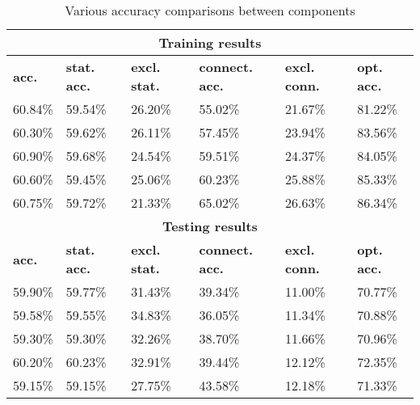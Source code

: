 \begin{table}[htp]
    \centering 
	\begin{tabular}{|l|l|l|l|l|l|}
		\hline
		\multicolumn{6}{|c|}{\bf Training results } \\ \hline
		{\bf acc.} & {\bf stat. acc.} & {\bf excl. stat.}& {\bf connect. acc. } & {\bf excl. conn. } & {\bf opt. acc.} \\ \hline
		60.84\%	   &  59.54\%    & 26.20\%   &  55.02\%  & 21.67\%   & 81.22\% \\ \hline
		60.30\%    &  59.62\%    & 26.11\%   &  57.45\%  & 23.94\%   & 83.56\% \\ \hline
		60.90\%    &  59.68\%    & 24.54\%   &  59.51\%  & 24.37\%   & 84.05\% \\ \hline
		60.60\%    &  59.45\%    & 25.06\%   &  60.23\%  & 25.88\%   & 85.33\% \\ \hline
		60.75\%    &  59.72\%    & 21.33\%   &  65.02\%  & 26.63\%   & 86.34\% \\ \hline
		\multicolumn{6}{|c|}{\bf Testing results } \\ \hline
		{\bf acc.} & {\bf stat. acc.} & {\bf excl. stat.} & {\bf connect. acc. } & {\bf excl. conn. } & {\bf opt. acc.} \\ \hline
		59.90\%    &  59.77\%   & 31.43\%   &  39.34\%   & 11.00\%   & 70.77\% \\ \hline
		59.58\%    &  59.55\%   & 34.83\%   &  36.05\%   & 11.34\%   & 70.88\% \\ \hline
		59.30\%    &  59.30\%   & 32.26\%   &  38.70\%   & 11.66\%   & 70.96\% \\ \hline
		60.20\%    &  60.23\%   & 32.91\%   &  39.44\%   & 12.12\%   & 72.35\% \\ \hline
		59.15\%    &  59.15\%   & 27.75\%   &  43.58\%   & 12.18\%   & 71.33\% \\ \hline
	\end{tabular}
	\caption{Various accuracy comparisons between components \label{table:ALLACCURACY}}
\end{table}

